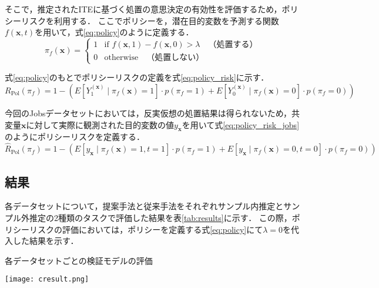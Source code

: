 \documentclass[dvipdfmx]{jreport}
\begin{document}
そこで，推定されたITEに基づく処置の意思決定の有効性を評価するため，ポリシーリスクを利用する．
ここでポリシーを，潜在目的変数を予測する関数$f(\boldsymbol{x}, t)$を用いて，式\eqref{eq:policy}のように定義する．
\begin{equation}
    \pi_f(\boldsymbol{x}) =
    \begin{cases}
    1 & \text{if } f(\boldsymbol{x},1) - f(\boldsymbol{x},0) > \lambda \quad \text{（処置する）} \\
    0 & \text{otherwise} \quad \text{（処置しない）} \label{eq:policy}
    \end{cases}
\end{equation}

式\eqref{eq:policy}のもとでポリシーリスクの定義を式\eqref{eq:policy_risk}に示す．
\begin{equation}
    R_{\text{Pol}}(\pi_f) = 1 - \left( E[Y_1^{(\boldsymbol{x})} \mid \pi_f(\boldsymbol{x}) = 1] \cdot p(\pi_f = 1)
    + E[Y_0^{(\boldsymbol{x})} \mid \pi_f(\boldsymbol{x}) = 0] \cdot p(\pi_f = 0) \right) \label{eq:policy_risk}
\end{equation}

今回のJobsデータセットにおいては，反実仮想の処置結果は得られないため，共変量$\boldsymbol{x}$に対して実際に観測された目的変数の値$y_{\boldsymbol{x}}$を用いて式\eqref{eq:policy_risk_jobs}のようにポリシーリスクを定義する．
\begin{equation}
    \hat{R}_{\text{Pol}}(\pi_f) = 1 - \left( E[y_{\boldsymbol{x}} \mid \pi_f(\boldsymbol{x}) = 1, t = 1] \cdot p(\pi_f = 1)
    + E[y_{\boldsymbol{x}} \mid \pi_f(\boldsymbol{x}) = 0, t = 0] \cdot p(\pi_f = 0) \right) \label{eq:policy_risk_jobs}
\end{equation}



\newpage
\subsection{結果}
各データセットについて，提案手法と従来手法をそれぞれサンプル内推定とサンプル外推定の2種類のタスクで評価した結果を表\ref{tab:results}に示す．
この際，ポリシーリスクの評価においては，ポリシーを定義する式\eqref{eq:policy}にて$\lambda = 0$を代入した結果を示す．
\begin{table}[h]
    \caption{各データセットごとの検証モデルの評価} \label{tab:results}
    \begin{center}
        \texttt{[image: cresult.png]}
    \end{center}
\end{table}
\end{document}
